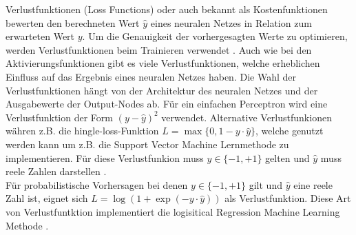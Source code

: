 Verlustfunktionen (Loss Functions) oder auch bekannt als Kostenfunktionen bewerten den berechneten Wert $\hat{y}$ eines neuralen 
Netzes in Relation zum erwarteten Wert $y$. Um die Genauigkeit der vorhergesagten Werte zu optimieren,
werden Verlustfunktionen beim Trainieren verwendet \cite{GBCL18}. Auch wie bei den Aktivierungsfunktionen gibt es
viele Verlustfunktionen, welche erheblichen Einfluss auf das Ergebnis eines neuralen Netzes haben. Die Wahl der Verlustfunktionen
hängt von der Architektur des neuralen Netzes und der Ausgabewerte der Output-Nodes ab. Für ein einfachen Perceptron wird eine 
Verlustfunktion der Form $(y - \hat{y})^2$ verwendet. 
Alternative Verlustfunkionen währen z.B. die hingle-loss-Funktion $L = \max\{0,1-y\cdot\hat{y}\}$, welche genutzt werden kann um z.B. die 
Support Vector Machine Lernmethode zu implementieren. Für diese Verlustfunkion muss $y \in \{-1,+1\}$ gelten und $\hat{y}$ muss reele Zahlen 
darstellen \cite{CA18}.\\
Für probabilistische Vorhersagen bei denen $y \in \{-1,+1\}$ gilt und $\hat{y}$ eine reele Zahl ist,  eignet sich 
$L = \log(1 + \exp(-y \cdot \hat{y}))$ als Verlustfunktion. Diese Art von Verlustfuntktion implementiert die logisitical Regression 
Machine Learning Methode \cite{CA18}.
